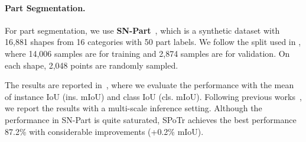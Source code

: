 \documentclass[10pt,twocolumn,letterpaper]{article}
\begin{document}
 \begin{table}[t]
  \centering
\setlength{\tabcolsep}{3pt}
  \caption{\textbf{Semantic segmentation results on S3DIS.} OA is the overall accuracy, mAcc is the mean of class accuracy, and mIoU is the mean of instance IoU.
  \label{tab:s3dis}
  }

\end{table} 
 
\paragraph{Part Segmentation.}
For part segmentation, we use \textbf{SN-Part}~\cite{snpart,lee2022sagemix}, which is a synthetic dataset with 16,881 shapes from 16 categories with 50 part labels.
We follow the split used in \cite{qi2017pointnet}, where 14,006 samples are for training and 2,874 samples are for validation. 
On each shape, 2,048 points are randomly sampled.

The results are reported in~, where we evaluate the performance with the mean of instance IoU (ins. mIoU) and class IoU (cls. mIoU). Following previous works~\cite{liu2019relation,xiang2021walk,xu2021paconv}, we report the results with a multi-scale inference setting. 
Although the performance in SN-Part is quite saturated, SPoTr achieves the best performance 87.2\% with considerable improvements (+0.2\% mIoU).
\end{document}
